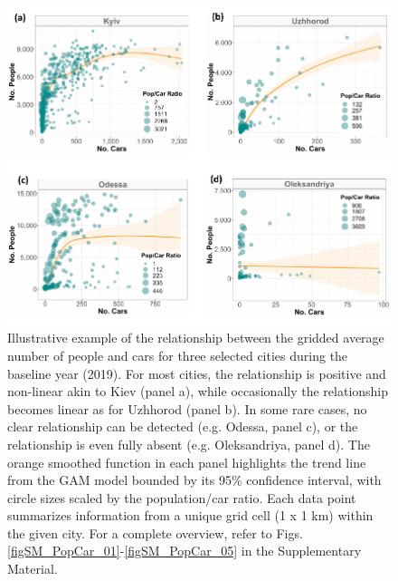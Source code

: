 \documentclass[sn-basic]{sn-jnl}%
\begin{document}
{%
\begin{figure}[hbtp]
\begin{center}
\includegraphics[width = \textwidth]{Figures/popcar_main.pdf}
\end{center}
\caption{Illustrative example of the relationship between the gridded average number of people and cars for three selected cities during the baseline year (2019). For most cities, the relationship is positive and non-linear akin to Kiev (panel a), while occasionally the relationship becomes linear as for Uzhhorod (panel b). In some rare cases, no clear relationship can be detected (e.g. Odessa, panel c), or the relationship is even fully absent (e.g. Oleksandriya, panel d). The orange smoothed function in each panel highlights the trend line from the GAM model bounded by its 95\% confidence interval, with circle sizes scaled by the population/car ratio. Each data point summarizes information from a unique grid cell (1 x 1 km) within the given city. For a complete overview, refer to Figs. \ref{figSM_PopCar_01}-\ref{figSM_PopCar_05} in the Supplementary Material.}
\label{Fig_popcar_main}
\end{figure}




}
\end{document}
